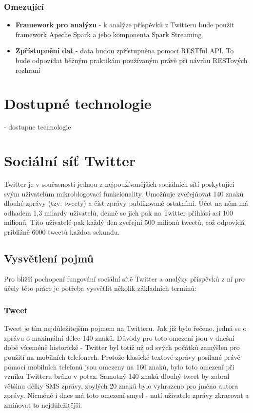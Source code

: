 \documentclass[thesis=B,czech]{FITthesis}[2012/06/26]
\begin{document}
\subsubsection{Omezující}
\begin{itemize}
\item \textbf{Framework pro analýzu} - k analýze příspěvků z Twitteru bude použit framework Apeche Spark a jeho komponenta Spark Streaming
\item \textbf{Zpřístupnění dat} - data budou zpřístupněna pomocí RESTful API. To bude odpovídat běžným praktikám používaným právě při návrhu RESTových rozhraní
\end{itemize}

\section{Dostupné technologie}
	- dostupne technologie

\section{Sociální síť Twitter}
\label{twitter-api}
	
	Twitter je v současnosti jednou z nejpoužívanějších sociálních sítí poskytující svým uživatelům mikroblogovací funkcionality. Umožňuje zveřejňovat 140 znaků dlouhé zprávy (tzv. tweety) a číst zprávy publikované ostatními. Účet na něm má odhadem 1,3 milardy uživatelů, denně se jich pak na Twitter přihlásí asi 100 milionů\cite{twitter-stats}. Tito uživatelé pak každý den zveřejní 500 milionů tweetů, což odpovídá približně 6000 tweetů každou sekundu\cite{twitter-stats-2}. 

\subsection{Vysvětlení pojmů}
Pro bližší pochopení fungování sociální sítě Twitter a analýzy příspěvků z ní pro účely této práce je potřeba vysvětlit několik základních termínů:

\subsubsection{Tweet}

Tweet je tím nejdůležitejším pojmem na Twitteru. Jak již bylo řečeno, jedná se o zprávu o maximální délce 140 znaků. Důvody pro toto omezení jsou v dnešní době víceméně historické - Twitter byl totiž už od svých počátků zamýšlen pro použití na mobilních telefonech. Protože klasické textové zprávy posílané právě pomocí mobilních telefonů jsou omezeny na 160 znaků, bylo toto omezení při vzniku Twitteru bráno v potaz. Samotný 140 znaků dlouhý tweet by zabral většinu délky SMS zprávy, zbylých 20 znaků bylo vyhrazeno pro jméno autora zprávy\cite{twitter-140}. Nicméně i dnes má toto omezení smysl - nutí uživatele zprávy zkracovat a zmiňovat to nejdůležitější. 
\end{document}

